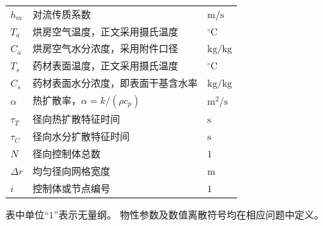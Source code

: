 \begin{longtable}{@{}p{}p{}p{}@{}}
$h_m$ & 对流传质系数 & $\mathrm{m/s}$ \\
$T_a$ & 烘房空气温度，正文采用摄氏温度 & ${}^\circ\mathrm{C}$ \\
$C_a$ & 烘房空气水分浓度，采用附件口径 & $\mathrm{kg/kg}$ \\
$T_s$ & 药材表面温度，正文采用摄氏温度 & ${}^\circ\mathrm{C}$ \\
$C_s$ & 药材表面水分浓度，即表面干基含水率 & $\mathrm{kg/kg}$ \\
$\alpha$ & 热扩散率，$\alpha=k/(\rho c_p)$ & $\mathrm{m^2/s}$ \\
$\tau_T$ & 径向热扩散特征时间 & $\mathrm{s}$ \\
$\tau_C$ & 径向水分扩散特征时间 & $\mathrm{s}$ \\
$N$ & 径向控制体总数 & $1$ \\
$\Delta r$ & 均匀径向网格宽度 & $\mathrm{m}$ \\
$i$ & 控制体或节点编号 & $1$ \\
\end{longtable}
\endgroup

表中单位“$1$”表示无量纲。
物性参数及数值离散符号均在相应问题中定义。
